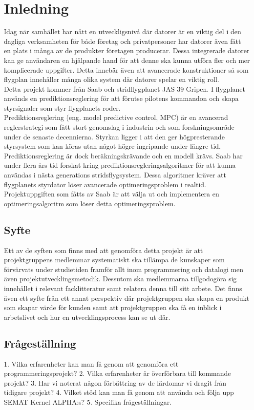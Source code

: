 \section{Inledning}
Idag när samhället har nått en utveckligsnivå där datorer är en viktig del i den dagliga verksamheten för både företag och privatpersoner har datorer även fått en plats i många av de produkter företagen producerar. Dessa integrerade datorer kan ge användaren en hjälpande hand för att denne ska kunna utföra fler och mer komplicerade uppgifter. Detta innebär även att avancerade konstruktioner så som flygplan innehåller många olika system där datorer spelar en viktig roll.
\\
Detta projekt kommer från Saab och stridflygplanet JAS 39 Gripen. I flygplanet används en prediktionsreglering för att förutse pilotens kommandon och skapa styrsignaler som styr flygplanets roder. 
\\
Prediktionsreglering (eng. model predictive control, MPC) är en avancerad reglerstrategi som fått stort genomslag i industrin och som forskningsområde under de senaste decennierna. Styrkan ligger i att den ger högpresterande styrsystem som kan köras utan något högre ingripande under längre tid. Prediktionsreglering är dock beräkningskrävande och en modell krävs. Saab har under flera års tid forskat kring prediktionsregleringsalgoritmer för att kunna användas i nästa generations stridsflygsystem. Dessa algoritmer kräver att flygplanets styrdator löser avancerade optimeringsproblem i realtid. Projektuppgiften som fåtts av Saab är att välja ut och implementera en optimeringsalgoritm som löser detta optimeringsproblem.   

\subsection{Syfte}
Ett av de syften som finns med att genomföra detta projekt är att projektgruppens medlemmar systematiskt ska tillämpa de kunskaper som förvärvats under studietiden framför allt inom programmering och datalogi men även projektutvecklingsmetodik. Dessutom ska medlemmarna tillgodogöra sig innehållet i relevant facklitteratur samt relatera denna till sitt arbete. 
Det finns även ett syfte från ett annat perspektiv där projektgruppen ska skapa en produkt som skapar värde för kunden samt att projektgruppen ska få en inblick i arbetslivet och hur en utvecklingsprocess kan se ut där.

\subsection{Frågeställning}
1. Vilka erfarenheter kan man få genom att genomföra ett programmeringsprojekt?
2. Vilka erfarenheter är överförbara till kommande projekt?
3. Har vi noterat någon förbättring av de lärdomar vi dragit från tidigare projekt?
4. Vilket stöd kan man få genom att använda och följa upp SEMAT Kernel ALPHA:s?
5. Specifika frågeställningar.



